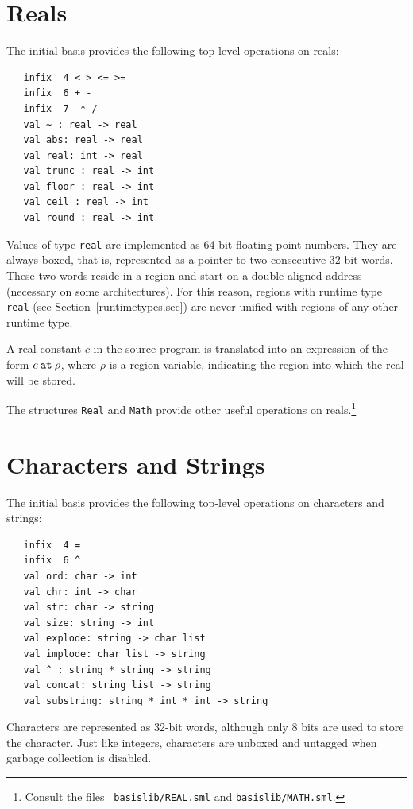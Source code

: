 \documentclass[12pt]{book}
\begin{document}
\section{Reals}
The 
%
initial basis provides the following top-level operations on reals:
%
%
%
%
%
%
%
%
%
%
%
%
%
%
%
%
%
\begin{verbatim}
   infix  4 < > <= >= 
   infix  6 + - 
   infix  7  * /
   val ~ : real -> real
   val abs: real -> real
   val real: int -> real
   val trunc : real -> int
   val floor : real -> int
   val ceil : real -> int
   val round : real -> int
\end{verbatim}
Values of type {\tt real} are implemented as 64-bit floating point
numbers.  They are always boxed, that is, represented as a pointer to
two consecutive 32-bit 
%
words.  These two words reside in a region and start on a
double-aligned address (necessary on some architectures). For this
reason, regions with
%
runtime type {\tt real} (see
Section~\ref{runtimetypes.sec}) are never unified with regions of any
other runtime type.

A real constant $c$ in the source program is translated into an
expression of the form 
%
$c\mathbin{\hbox{\tt at}}\rho$, where $\rho$ is a region variable, indicating the region
into which the real will be stored.

The structures {\tt Real} and {\tt Math} provide other useful
operations on reals.\footnote{Consult the files {\tt
    basislib/REAL.sml} and {\tt basislib/MATH.sml}.}

\section{Characters and Strings}
The 
%
initial basis provides the following top-level operations on characters and strings:
%
%
%
%
%
%
%
%
%
%
\begin{verbatim}
   infix  4 = 
   infix  6 ^
   val ord: char -> int
   val chr: int -> char
   val str: char -> string
   val size: string -> int
   val explode: string -> char list
   val implode: char list -> string
   val ^ : string * string -> string
   val concat: string list -> string
   val substring: string * int * int -> string
\end{verbatim}
Characters are represented as 32-bit words, although only 8 bits are
used to store the character. Just like integers, characters are
unboxed and untagged when garbage collection is disabled.
\end{document}
